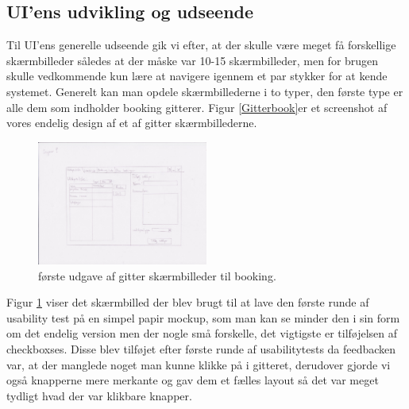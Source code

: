 \subsection{UI'ens udvikling og udseende}
Til UI'ens generelle udseende gik vi efter, at der skulle være meget få forskellige skærmbilleder således at der måske var 10-15 skærmbilleder, men for brugen skulle vedkommende kun lære at navigere igennem et par stykker for at kende systemet.
Generelt kan man opdele skærmbillederne i to typer, den første type er alle dem som indholder booking gitterer.
Figur \ref{Gitterbook}er et screenshot af vores endelig design af et af gitter skærmbillederne.
\begin{figure}[h!]
\label{PapirGitterBook}
  \caption{første udgave af gitter skærmbilleder til booking.}
  \centering
    \includegraphics[width=0.5\textwidth]{Appendix/GUI-Prototype/PaperMockup/UdstyrsListe}
\end{figure}

Figur \ref{PapirGitterBook} viser det skærmbilled der blev brugt til at lave den første runde af usability test på en simpel papir mockup, som man kan se minder den i sin form om det endelig version men der nogle små forskelle, det vigtigste er tilføjelsen af checkboxses. Disse blev tilføjet efter første runde af usabilitytests da feedbacken var, at der manglede noget man kunne klikke på i gitteret, derudover gjorde vi også knapperne mere merkante og gav dem et fælles layout så det var meget tydligt hvad der var klikbare knapper.


